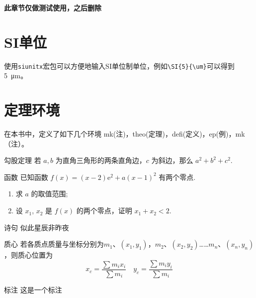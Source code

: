 \documentclass{gbook}
\begin{document}
\textbf{此章节仅做测试使用，之后删除}

\section{SI单位}

使用\verb+siunitx+宏包可以方便地输入SI单位制单位，例如\verb+\SI{5}{\um}+可以得到\SI{5}{\um}。

\section{定理环境}

在本书中，定义了如下几个环境
mk(注)，theo(定理)，defi(定义)，ep(例)，mk（注）。

\begin{theo}{勾股定理}{}
若 $a,b$ 为直角三角形的两条直角边，$c$ 为斜边，那么 $a^2 + b^2 + c^2.$
\end{theo}

\begin{qu}{函数}{}
已知函数 $ f(x) = (x - 2)\mathrm{e}^{2} + a (x - 1)^{2} $ 有两个零点.
\begin{enumerate}[label=(\arabic*)]
  \item 求 $ a $ 的取值范围;
  \item 设 $ x_{1} $, $ x_{2} $ 是 $ f(x) $ 的两个零点，证明 $ x_{1} + x_{2} < 2 $.
\end{enumerate}
\end{qu}

\begin{ep}{诗句}{}
似此星辰非昨夜
\end{ep}

\begin{defi}{质心}{}
若各质点质量与坐标分别为$m_1$、$(x_1,y_1)$，$m_2$、$(x_2,y_2)$……$m_n$、$(x_n,y_n)$，则质心位置为
$$x_c = \frac{\sum m_i x_i}{\sum m_i} \quad y_c = \frac{\sum m_i y_i}{\sum m_i}$$
\end{defi}

\begin{mk}{标注}{}
这是一个标注
\end{mk}
\end{document}
